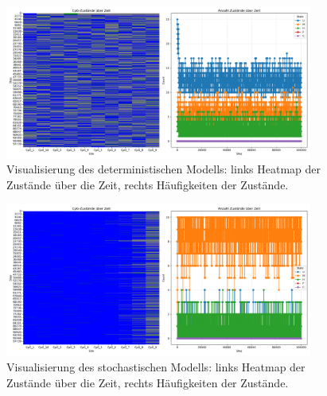 \documentclass{SeminarV2}
\begin{document}
\begin{figure}[htbp]
\centering
\includegraphics[width=0.9\textwidth]{images/cpg_states_plot_det.png}
\caption{Visualisierung des deterministischen Modells: links Heatmap der Zustände über die Zeit, rechts Häufigkeiten der Zustände.}
\label{fig:cpg_states_det}
\end{figure}

\begin{figure}[htbp]
\centering
\includegraphics[width=0.9\textwidth]{images/cpg_states_plot_stoch.png}
\caption{Visualisierung des stochastischen Modells: links Heatmap der Zustände über die Zeit, rechts Häufigkeiten der Zustände.}
\label{fig:cpg_states_stoch}
\end{figure}
\end{document}
